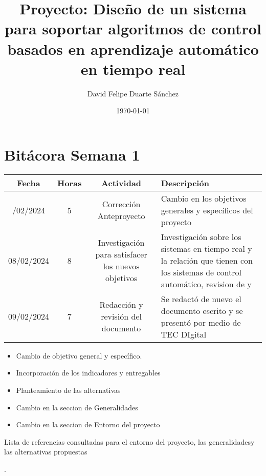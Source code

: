 \documentclass{article}
\title{Proyecto: Diseño de un sistema para soportar algoritmos de control basados en aprendizaje automático en tiempo real}
\author{David Felipe Duarte Sánchez}
\date{\today}
\begin{document}
\maketitle
\section*{Bitácora Semana 1}

\begin{longtable}[c]{|c|c|c|p{6cm}|}
\hline
\textbf{Fecha} & \textbf{Horas} & \textbf{Actividad} & \textbf{Descripción} \\
\hline
\endhead
\hline
\endfoot
07/02/2024 & 5 & Corrección Anteproyecto & Cambio en los objetivos generales y específicos del proyecto \\
08/02/2024 & 8 & Investigación para satisfacer los nuevos objetivos & Investigación  sobre los sistemas en tiempo real y la relación que tienen con los sistemas de control  automático, revision de \cite{alonso2010panoramica} \cite{zhao2017hardware} y \cite{kim1994software}\\
09/02/2024 & 7 & Redacción y revisión del documento & Se redactó de nuevo el documento escrito y se presentó por medio de TEC DIgital \\
\hline
\end{longtable}


\begin{itemize}
    \item Cambio de objetivo general y específico.
    \item Incorporación de los indicadores y entregables
    \item Planteamiento de las  alternativas
    \item Cambio en la seccion de Generalidades
    \item Cambio en la seccion de Entorno del proyecto
\end{itemize}

Lista de referencias consultadas para el entorno del proyecto, las generalidadesy  las alternativas propuestas


\nocite{de2000introduccion}
\nocite{alonso2010panoramica}
\nocite{munoz1994extensiones}
\nocite{zhao2017hardware}
\nocite{shi2011vcuda}
\nocite{deng2020model}
\nocite{duato2011enabling}.
\nocite{scarpino2011opencl} 
\nocite{owaida2011massively}
\nocite{meyer2020evaluating} 
\nocite{verma2016accelerating}
\nocite{galan2000control} 
\nocite{kim1994software} 
\nocite{razdan1994prisc}
\nocite{owaida2011massively}



\end{document}

